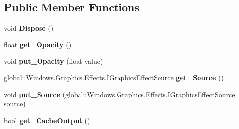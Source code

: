 \subsection*{Public Member Functions}
\begin{DoxyCompactItemize}
\item 
\mbox{\label{class_microsoft_1_1_graphics_1_1_canvas_1_1_effects_1_1_opacity_effect_a1246fe8a73f548e85044aa9a5849aabc}} 
void {\bfseries Dispose} ()
\item 
\mbox{\label{class_microsoft_1_1_graphics_1_1_canvas_1_1_effects_1_1_opacity_effect_a3a7a9f455303d589535bffc1fbff1ed7}} 
float {\bfseries get\+\_\+\+Opacity} ()
\item 
\mbox{\label{class_microsoft_1_1_graphics_1_1_canvas_1_1_effects_1_1_opacity_effect_a12edc59773ce19245163b1e4f33ab94a}} 
void {\bfseries put\+\_\+\+Opacity} (float value)
\item 
\mbox{\label{class_microsoft_1_1_graphics_1_1_canvas_1_1_effects_1_1_opacity_effect_a2d98ab034bde8cfb8102ebc23ccf5f02}} 
global\+::\+Windows.\+Graphics.\+Effects.\+I\+Graphics\+Effect\+Source {\bfseries get\+\_\+\+Source} ()
\item 
\mbox{\label{class_microsoft_1_1_graphics_1_1_canvas_1_1_effects_1_1_opacity_effect_a51fd5110fa28908e4867c288ed9a30d9}} 
void {\bfseries put\+\_\+\+Source} (global\+::\+Windows.\+Graphics.\+Effects.\+I\+Graphics\+Effect\+Source source)
\item 
\mbox{\label{class_microsoft_1_1_graphics_1_1_canvas_1_1_effects_1_1_opacity_effect_a7a670a01415eb1ff9f50c8405404c02b}} 
bool {\bfseries get\+\_\+\+Cache\+Output} ()
\item 
\mbox{\label{class_microsoft_1_1_graphics_1_1_canvas_1_1_effects_1_1_opacity_effect_a42248a501afee0e1d6884be01879797e}} 

\end{DoxyCompactItemize}
